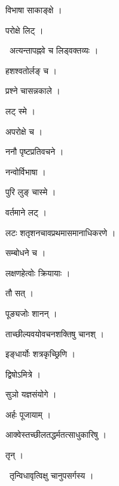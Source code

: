 \documentclass[10pt, openany, oneside]{book}
\begin{document}
\noindent विभाषा साकाङ्क्षे ।

\noindent परोक्षे लिट् ।

\par\noindent\hspace{1.5em}{\vps वा॰}~{\qt अत्यन्तापह्नवे च लिड्वक्तव्यः ।}

\noindent हशश्वतोर्लङ् च ।

\noindent प्रश्ने चासन्नकाले ।

\noindent लट् स्मे ।

\noindent अपरोक्षे च ।

\noindent ननौ पृष्टप्रतिवचने ।

\noindent नन्वोर्विभाषा ।

\noindent पुरि लुङ् चास्मे ।

\noindent वर्तमाने लट् ।

\noindent लटः शतृशनचावप्रथमासमानाधिकरणे ।

\noindent सम्बोधने च ।

\noindent लक्षणहेत्वोः क्रियायाः ।

\noindent तौ सत् ।

\noindent पूङ्यजोः शानन् ।

\noindent ताच्छील्यवयोवचनशक्तिषु चानश् ।

\noindent इङ्धार्योः शत्रकृच्छ्रिणि ।

\noindent द्विषोऽमित्रे ।

\noindent सुञो यज्ञसंयोगे ।

\noindent अर्हः पूजायाम् ।

\noindent आक्वेस्तच्छीलतद्धर्मतत्साधुकारिषु ।

\noindent तृन् ।

\par\noindent\hspace{1.5em}{\vps वा॰}~{\qt तृन्विधावृत्विक्षु चानुपसर्गस्य ।}
\end{document}

